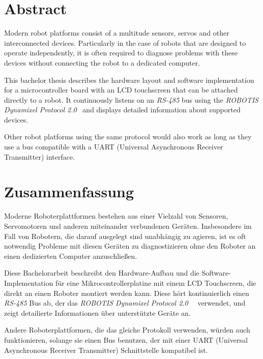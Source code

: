 \section*{Abstract}
\label{abstract}

Modern robot platforms consist of a multitude sensors, servos and other interconnected devices.
Particularly in the case of robots that are designed to operate independently, it is often required
to diagnose problems with these devices without connecting the robot to a dedicated computer.

This bachelor thesis describes the hardware layout and software implementation for a microcontroller
board with an LCD touchscreen that can be attached directly to a robot. It continuously listens on
an \textit{RS-485} bus using the \textit{ROBOTIS Dynamixel Protocol 2.0}~\cite{dynamixel-protocol-2}
and displays detailed information about supported devices.

Other robot platforms using the same protocol would also work as long as they use a bus compatible
with a UART (Universal Asynchronous Receiver Transmitter) interface.

\vfill
\section*{Zusammenfassung}
\label{zusammenfassung}

Moderne Roboterplattformen bestehen aus einer Vielzahl von Sensoren, Servomotoren und anderen
miteinander verbundenen Geräten. Insbesondere im Fall von Robotern, die darauf ausgelegt sind
unabhängig zu agieren, ist es oft notwendig Probleme mit diesen Geräten zu diagnostizieren ohne den
Roboter an einen dedizierten Computer anzuschließen.

Diese Bachelorarbeit beschreibt den Hardware-Aufbau und die Software-Implementation für eine
Mikrocontrollerplatine mit einem LCD Touchscreen, die direkt an einen Roboter montiert werden kann.
Diese hört kontinuierlich einen \textit{RS-485} Bus ab, der das \textit{ROBOTIS Dynamixel Protocol 2.0}~\
\cite{dynamixel-protocol-2} verwendet, und zeigt detailierte Informationen über unterstützte Geräte an.

Andere Roboterplattformen, die das gleiche Protokoll verwenden, würden auch funktionieren, solange
sie einen Bus benutzen, der mit einer UART (Universal Asynchronous Receiver Transmitter) Schnittstelle
kompatibel ist.
